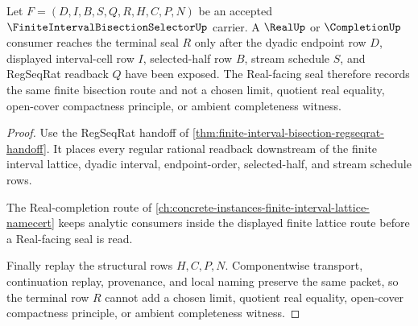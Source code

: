 \begin{theorem}
\label{thm:finite-interval-bisection-real-seal-nonescape}
Let $F=(D,I,B,S,Q,R,H,C,P,N)$ be an accepted $\FiniteIntervalBisectionSelectorUp$ carrier. A $\RealUp$ or $\CompletionUp$ consumer reaches the terminal seal $R$ only after the dyadic endpoint row $D$, displayed interval-cell row $I$, selected-half row $B$, stream schedule $S$, and RegSeqRat readback $Q$ have been exposed. The Real-facing seal therefore records the same finite bisection route and not a chosen limit, quotient real equality, open-cover compactness principle, or ambient completeness witness.
\end{theorem}
\begin{proof}
Use the RegSeqRat handoff of \autoref{thm:finite-interval-bisection-regseqrat-handoff}. It places every regular rational readback downstream of the finite interval lattice, dyadic interval, endpoint-order, selected-half, and stream schedule rows.

The Real-completion route of \autoref{ch:concrete-instances-finite-interval-lattice-namecert} keeps analytic consumers inside the displayed finite lattice route before a Real-facing seal is read.

Finally replay the structural rows $H,C,P,N$. Componentwise transport, continuation replay, provenance, and local naming preserve the same packet, so the terminal row $R$ cannot add a chosen limit, quotient real equality, open-cover compactness principle, or ambient completeness witness.
\end{proof}


\begin{closurestatus}{\FiniteIntervalBisectionSelectorUp}
  \theoryclosure{\seedClosure}
  \formalstatus{\unformalizedV}
\end{closurestatus}
